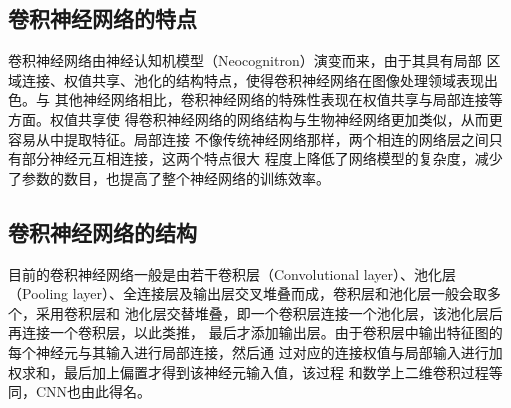  
  \subsection{\hei\xiaosan\textbf{卷积神经网络的特点}}
    卷积神经网络由神经认知机模型（Neocognitron）演变而来，由于其具有局部
    区域连接、权值共享、池化的结构特点，使得卷积神经网络在图像处理领域表现出色。与
    其他神经网络相比，卷积神经网络的特殊性表现在权值共享与局部连接等方面。权值共享使
    得卷积神经网络的网络结构与生物神经网络更加类似，从而更容易从中提取特征。局部连接
    不像传统神经网络那样，两个相连的网络层之间只有部分神经元互相连接，这两个特点很大
    程度上降低了网络模型的复杂度，减少了参数的数目，也提高了整个神经网络的训练效率。

  
  \subsection{\hei\xiaosan\textbf{卷积神经网络的结构}}
    目前的卷积神经网络一般是由若干卷积层（Convolutional layer）、池化层（Pooling 
    layer）、全连接层及输出层交叉堆叠而成，卷积层和池化层一般会取多个，采用卷积层和
    池化层交替堆叠，即一个卷积层连接一个池化层，该池化层后再连接一个卷积层，以此类推，
    最后才添加输出层。由于卷积层中输出特征图的每个神经元与其输入进行局部连接，然后通
    过对应的连接权值与局部输入进行加权求和，最后加上偏置才得到该神经元输入值，该过程
    和数学上二维卷积过程等同，CNN也由此得名。